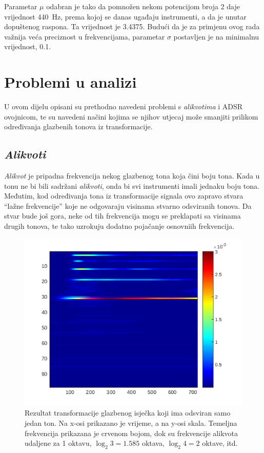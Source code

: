 \documentclass[a4paper, 11pt, twocolumn]{article}
\begin{document}
Parametar $\mu$ odabran je tako da pomnožen nekom potencijom broja 2 daje vrijednost 440\ Hz, prema kojoj se danas ugađaju instrumenti, a da je unutar dopuštenog raspona. Ta vrijednost je 3.4375.
Budući da je za primjenu ovog rada važnija veća preciznost u frekvencijama, parametar $\sigma$ postavljen je na minimalnu vrijednost, 0.1.

\section{Problemi u analizi}
U ovom dijelu opisani su prethodno navedeni problemi s \textit{alikvotima} i ADSR ovojnicom, te su navedeni načini kojima se njihov utjecaj može smanjiti prilikom određivanja glazbenih tonova iz transformacije.

\subsection{\textit{Alikvoti}}
\label{ss:alikvoti}
\textit{Alikvot} je pripadna frekvencija nekog glazbenog tona koja čini boju tona.
Kada u tonu ne bi bili sadržani \textit{alikvoti}, onda bi svi instrumenti imali jednaku boju tona.
Međutim, kod određivanja tona iz transformacije signala ovo zapravo stvara ``lažne frekvencije'' koje ne odgovaraju visinama stvarno odsviranih tonova.
Da stvar bude još gora, neke od tih frekvencija mogu se preklapati sa visinama drugih tonova, te tako uzrokuju dodatno pojačanje osnovniih frekvencija.

\begin{figure}[htb]
  \includegraphics[width=\linewidth]{alikvoti}
  \caption{Rezultat transformacije glazbenog isječka koji ima odsviran samo jedan ton. Na x-osi prikazano je vrijeme, a na y-osi skala. Temeljna frekvencija prikazana je crvenom bojom, dok su frekvencije alikvota udaljene za 1 oktavu, $\log_2{3}=1.585$ oktava, $\log_2{4}=2$ oktave, itd.}
  \label{fig:alikvoti}
\end{figure}
\end{document}
